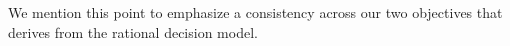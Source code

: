  We mention this point to emphasize a consistency across our two objectives that derives from the rational decision model. 
